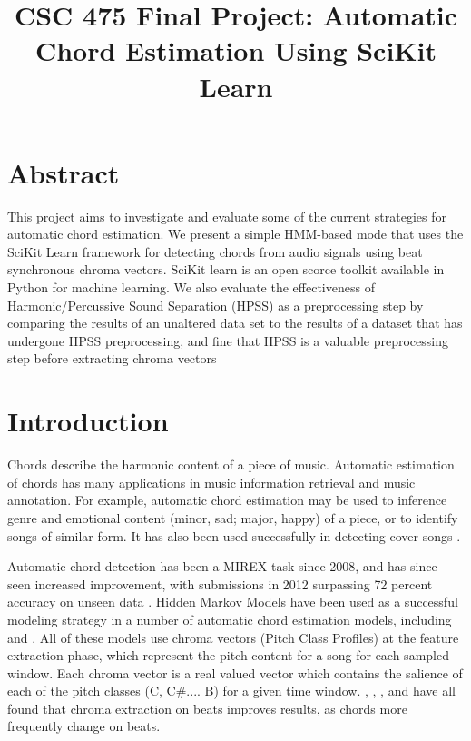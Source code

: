 \documentclass{article}
\title{CSC 475 Final Project: Automatic Chord Estimation Using SciKit Learn}
\begin{document}
%
\maketitle
%


\section{Abstract}\label{sec:desoutline}
This project aims to investigate and evaluate some of the current strategies
for automatic chord estimation. We present a simple HMM-based mode that uses
the SciKit Learn framework for detecting chords from audio signals using beat 
synchronous chroma vectors.  SciKit learn is an open scorce toolkit available
in Python for machine learning. We also evaluate the effectiveness of 
Harmonic/Percussive Sound Separation (HPSS) as a preprocessing step by comparing
the results of an unaltered data set to the results of a dataset that has undergone HPSS
preprocessing, and fine that HPSS is a valuable preprocessing step before extracting
chroma vectors

\section{Introduction}\label{sec:intro}

Chords describe the harmonic content of a piece of music. Automatic estimation
of chords has many applications in music information retrieval and music
annotation. For example, automatic chord estimation may be used to inference
genre and emotional content (minor, sad; major, happy) of a piece, or to
identify songs of similar form.  It has also been used successfully in
detecting cover-songs \cite{Papadopoulos:18}.

Automatic chord detection has been a MIREX task since 2008, and has since seen
increased improvement, with submissions in 2012 surpassing 72 percent accuracy
on unseen data \cite{McVicar:00}. Hidden Markov Models have been used as a
successful modeling strategy in a number of automatic chord estimation models,
including \cite{Ueda:01} \cite{Lee:15} \cite{Ueda:19} and
\cite{Papadopoulos:18}. All of these models use chroma vectors (Pitch Class
Profiles) at the feature extraction phase, which represent the pitch content
for a song for each sampled window. Each chroma vector is a real valued vector
which contains the salience of each of the pitch classes (C, C\#.... B) for a
given time window. \cite{McVicar:00},  \cite{Lee:15}, \cite{Papadopoulos:18},
and\cite{Zenz:20} have all found that chroma extraction on beats improves
results, as chords more frequently change on beats.
\end{document}
